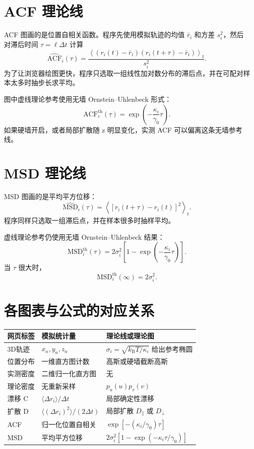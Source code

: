 \documentclass[UTF8,a4paper,12pt,fontset=fandol]{ctexart}
\newcommand{\kb}{k_{\mathrm B}}
\begin{document}
\section{ACF 理论线}

ACF 图画的是位置自相关函数。程序先使用模拟轨迹的均值 $\bar r_i$ 和方差 $s_i^2$，然后对滞后时间 $\tau=\ell\Delta t$ 计算
\[
  \widehat{\mathrm{ACF}}_i(\tau)
  =
  \frac{
  \left\langle
  (r_i(t)-\bar r_i)(r_i(t+\tau)-\bar r_i)
  \right\rangle_t
  }{s_i^2}.
\]
为了让浏览器绘图更快，程序只选取一组线性加对数分布的滞后点，并在可配对样本太多时抽步长求平均。

图中虚线理论参考使用无墙 Ornstein--Uhlenbeck 形式：
\[
  \mathrm{ACF}_i^{\mathrm{th}}(\tau)
  =
  \exp\!\left(-\frac{\kappa_i}{\gamma_0}\tau\right).
\]
如果硬墙开启，或者局部扩散随 z 明显变化，实测 ACF 可以偏离这条无墙参考线。

\section{MSD 理论线}

MSD 图画的是平均平方位移：
\[
  \widehat{\mathrm{MSD}}_i(\tau)
  =
  \left\langle
  \left[r_i(t+\tau)-r_i(t)\right]^2
  \right\rangle_t.
\]
程序同样只选取一组滞后点，并在样本很多时抽样平均。

虚线理论参考仍使用无墙 Ornstein--Uhlenbeck 结果：
\[
  \mathrm{MSD}_i^{\mathrm{th}}(\tau)
  =
  2\sigma_i^2
  \left[
  1-\exp\!\left(-\frac{\kappa_i}{\gamma_0}\tau\right)
  \right].
\]
当 $\tau$ 很大时，
\[
  \mathrm{MSD}_i^{\mathrm{th}}(\infty)=2\sigma_i^2.
\]

\section{各图表与公式的对应关系}

\begin{center}
\begin{tabular}{lll}
\toprule
网页标签 & 模拟统计量 & 理论线或理论图 \\
\midrule
3D轨迹 & $x_n,y_n,z_n$ & $\sigma_i=\sqrt{\kb T/\kappa_i}$ 给出参考椭圆 \\
位置分布 & 一维直方图计数 & 高斯或硬墙截断高斯 \\
实测密度 & 二维归一化直方图 & 无 \\
理论密度 & 无重新采样 & $p_u(u)p_v(v)$ \\
漂移 C & $\langle\Delta r_i\rangle/\Delta t$ & 局部确定性漂移 \\
扩散 D & $\langle(\Delta r_i)^2\rangle/(2\Delta t)$ & 局部扩散 $D_{\parallel}$ 或 $D_{\perp}$ \\
ACF & 归一化位置自相关 & $\exp[-(\kappa_i/\gamma_0)\tau]$ \\
MSD & 平均平方位移 & $2\sigma_i^2[1-\exp(-\kappa_i\tau/\gamma_0)]$ \\
\bottomrule
\end{tabular}
\end{center}
\end{document}
